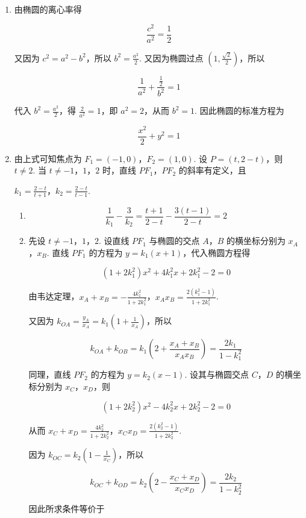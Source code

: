 \begin{solution}
\begin{enumerate}
\item 由椭圆的离心率得

\[
\frac{c^2}{a^2}=\frac{1}{2}
\]

又因为 \(c^2=a^2-b^2\)，所以 \(b^2=\frac{a^2}{2}\). 又因为椭圆过点 \(\left(1,\frac{\sqrt{2}}{2}\right)\)，所以

\[
\frac{1}{a^2}+\frac{\frac{1}{2}}{b^2}=1
\]

代入 \(b^2=\frac{a^2}{2}\)，得 \(\frac{2}{a^2}=1\)，即 \(a^2=2\)，从而 \(b^2=1\). 因此椭圆的标准方程为

\[
\frac{x^2}{2}+y^2=1
\]

\item 由上式可知焦点为 \(F_1=(-1,0)\)，\(F_2=(1,0)\). 设 \(P=(t,2-t)\)，则 \(t\ne2\). 当 \(t\ne-1\)，\(1\)，\(2\) 时，直线 \(PF_1\)，\(PF_2\) 的斜率有定义，且

\(k_1=\frac{2-t}{t+1}\)，\(k_2=\frac{2-t}{t-1}\).

\begin{enumerate}
\item

\[
\frac{1}{k_1}-\frac{3}{k_2}=\frac{t+1}{2-t}-\frac{3(t-1)}{2-t}=2
\]

\item 先设 \(t\ne-1\)，\(1\)，\(2\). 设直线 \(PF_1\) 与椭圆的交点 \(A\)，\(B\) 的横坐标分别为 \(x_A\)，\(x_B\). 直线 \(PF_1\) 的方程为 \(y=k_1(x+1)\)，代入椭圆方程得

\[
(1+2k_1^2)x^2+4k_1^2x+2k_1^2-2=0
\]

由韦达定理，\(x_A+x_B=-\frac{4k_1^2}{1+2k_1^2}\)，\(x_Ax_B=\frac{2(k_1^2-1)}{1+2k_1^2}\).

又因为 \(k_{OA}=\frac{y_A}{x_A}=k_1\left(1+\frac{1}{x_A}\right)\)，所以

\[
k_{OA}+k_{OB}=k_1\left(2+\frac{x_A+x_B}{x_Ax_B}\right)=\frac{2k_1}{1-k_1^2}
\]

同理，直线 \(PF_2\) 的方程为 \(y=k_2(x-1)\). 设其与椭圆交点 \(C\)，\(D\) 的横坐标分别为 \(x_C\)，\(x_D\)，则

\[
(1+2k_2^2)x^2-4k_2^2x+2k_2^2-2=0
\]

从而 \(x_C+x_D=\frac{4k_2^2}{1+2k_2^2}\)，\(x_Cx_D=\frac{2(k_2^2-1)}{1+2k_2^2}\).

因为 \(k_{OC}=k_2\left(1-\frac{1}{x_C}\right)\)，所以

\[
k_{OC}+k_{OD}=k_2\left(2-\frac{x_C+x_D}{x_Cx_D}\right)=\frac{2k_2}{1-k_2^2}
\]

因此所求条件等价于


\end{enumerate}
\end{enumerate}
\end{solution}
